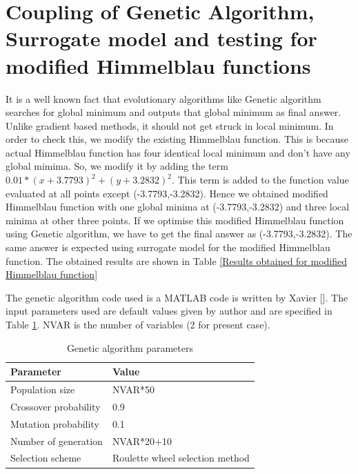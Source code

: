 \section{Coupling of Genetic Algorithm, Surrogate model and testing for modified Himmelblau functions}
\label{Modified Himmelblau function}
It is a well known fact that evolutionary algorithms like Genetic algorithm searches for global minimum and outputs that global minimum as final answer. Unlike gradient based methods, it should not get struck in local minimum. In order to check this, we modify the existing Himmelblau function. This is because actual Himmelblau function has four identical local minimum and don't have any global mimima. So, we modify it by adding the term $  0.01* (x + 3.7793)^2 + (y + 3.2832)^2 $. This term is added to the function value evaluated at all points except (-3.7793,-3.2832). Hence we obtained modified Himmelblau function with one global minima at (-3.7793,-3.2832) and three local minima at other three points. If we optimise this modified Himmelblau function using Genetic algorithm, we have to get the final answer as (-3.7793,-3.2832). The same answer is expected using surrogate model for the modified Himmelblau function. The obtained results are shown in Table \ref{Results obtained for modified Himmelblau function}

The genetic algorithm code used is a MATLAB code is written by Xavier []. The input parameters used are default values given by author and are specified in Table \ref{Genetic algorithm parametres}. NVAR is the number of variables (2 for present case).
\begin{table}[H]
	\centering
	\caption{Genetic algorithm parameters}
	\label{Genetic algorithm parametres}
	\begin{tabular}{ll}
		\hline \hline
		Parameter & Value \\
		\hline
		Population size & NVAR*50 \\
 		Crossover probability & 0.9 \\
 		Mutation probability & 0.1 \\
 		Number of generation & NVAR*20+10 \\
 		Selection scheme & Roulette wheel selection method \\
		
		\hline \hline
		
	\end{tabular}
\end{table}


